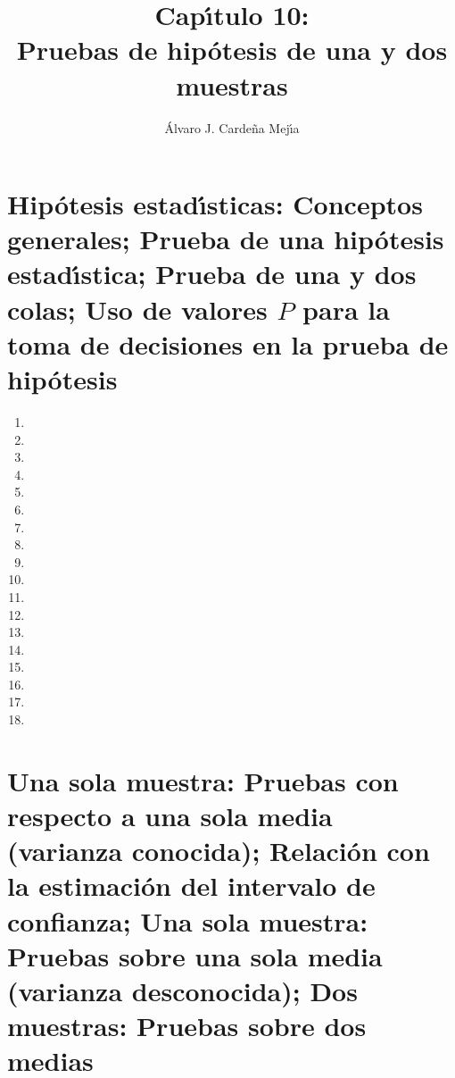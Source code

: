 \documentclass[a4paper,11pt]{article}
\title{Cap\'{\i}tulo 10:\\ Pruebas de hip\'otesis de una y dos muestras}
\author{\'Alvaro J. Carde\~na Mej\'{\i}a}
\theoremstyle{teoremas}
\theoremstyle{ejemplos}
\theoremstyle{definiciones}
\theoremstyle{lemas}
\begin{document}
\maketitle

\section{Hip\'otesis estad\'{\i}sticas: Conceptos generales; Prueba de una hip\'otesis estad\'{\i}stica; Prueba de una y dos colas; Uso de valores $P$ para la toma de decisiones en la prueba de hip\'otesis}

\begin{enumerate}
 \item  %
 \item 
 \item 
 \item 
 \item 
 \item 
 \item 
 \item 
 \item 
 \item 
 \item 
 \item 
 \item 
 \item 
 \item 
 \item 
 \item 
 \newpage
 \item 
\end{enumerate}

\newpage

\section{Una sola muestra: Pruebas con respecto a una sola media (varianza conocida); Relaci\'on con la estimaci\'on del intervalo de confianza; Una sola muestra: Pruebas sobre una sola media (varianza desconocida); Dos muestras: Pruebas sobre dos medias}
\end{document}
